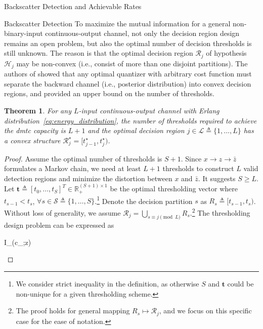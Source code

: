 \documentclass[journal]{IEEEtran}
\newtheorem{theorem}{Theorem}
\begin{document}
\begin{section}{Backscatter Detection and Achievable Rates}
\begin{subsection}{Backscatter Detection}
			To maximize the mutual information for a general non-binary-input continuous-output channel, not only the decision region design remains an open problem, but also the optimal number of decision thresholds is still unknown. The reason is that the optimal decision region $\mathcal{R}_j$ of hypothesis $\mathcal{H}_j$ may be non-convex (i.e., consist of more than one disjoint partitions). The authors of \cite{Nguyen2021} showed that any optimal quantizer with arbitrary cost function must separate the backward channel  (i.e., posterior distribution) into convex decision regions, and provided an upper bound on the number of thresholds.

			\begin{theorem}
				For any $L$-input continuous-output channel with Erlang distribution~\eqref{eq:energy_distribution}, the number of thresholds required to achieve the \gls{dmtc} capacity is $L+1$ and the optimal decision region $j \in \mathcal{L} \triangleq \{1,\ldots,L\}$ has a convex structure $\mathcal{R}_j^\star = [t_{j-1}^\star, t_j^\star)$.
			\end{theorem}

			\begin{proof}
				Assume the optimal number of thresholds is $S+1$. Since $x \to z \to \bar{z}$ formulates a Markov chain, we need at least $L+1$ thresholds to construct $L$ valid detection regions and minimize the distortion between $x$ and $\bar{z}$. It suggests $S \ge L$. Let $\boldsymbol{t} \triangleq [t_0,\ldots,t_S]^T \in \mathbb{R}_{+}^{(S+1) \times 1}$ be the optimal thresholding vector where $t_{s-1} < t_s$, $\forall s \in \mathcal{S} \triangleq \{1,\ldots,S\}$.\footnote{We consider strict inequality in the definition, as otherwise $S$ and $\boldsymbol{t}$ could be non-unique for a given thresholding scheme.} Denote the decision partition $s$ as $R_s \triangleq [t_{s-1},t_s)$. Without loss of generality, we assume $\mathcal{R}_j = \bigcup_{s \equiv j \pmod L} R_s$.\footnote{The proof holds for general mapping $R_s \mapsto \mathcal{R}_j$, and we focus on this specific case for the ease of notation.} The thresholding design problem can be expressed as
				\begin{maxi!}
					{}{I_{}(c_{};z)}{\label{op:thresholding}}{\label{ob:backscatter_mutual_information}}
				\end{maxi!}


\end{proof}
\end{subsection}
\end{section}
\end{document}
